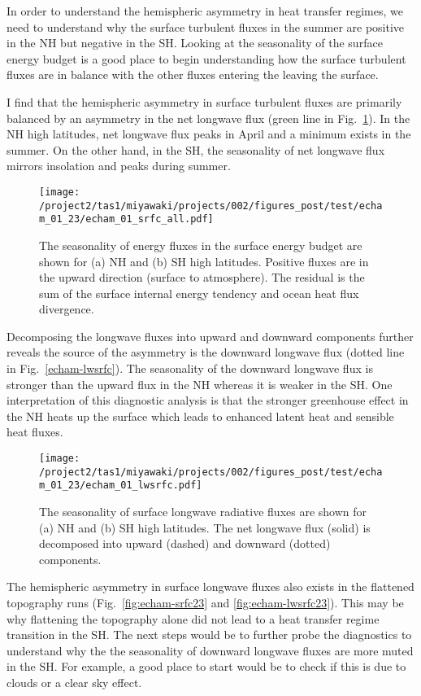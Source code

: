 \documentclass{article}
\begin{document}
In order to understand the hemispheric asymmetry in heat transfer regimes, we need to understand why the surface turbulent fluxes in the summer are positive in the NH but negative in the SH. Looking at the seasonality of the surface energy budget is a good place to begin understanding how the surface turbulent fluxes are in balance with the other fluxes entering the leaving the surface.

I find that the hemispheric asymmetry in surface turbulent fluxes are primarily balanced by an asymmetry in the net longwave flux (green line in Fig.~\ref{fig:echam-srfc}). In the NH high latitudes, net longwave flux peaks in April and a minimum exists in the summer. On the other hand, in the SH, the seasonality of net longwave flux mirrors insolation and peaks during summer.

\begin{figure}
    \texttt{[image: /project2/tas1/miyawaki/projects/002/figures\_post/test/echam\_01\_23/echam\_01\_srfc\_all.pdf]}
    \caption{The seasonality of energy fluxes in the surface energy budget are shown for (a) NH and (b) SH high latitudes. Positive fluxes are in the upward direction (surface to atmosphere). The residual is the sum of the surface internal energy tendency and ocean heat flux divergence.}
    \label{fig:echam-srfc}
\end{figure}

Decomposing the longwave fluxes into upward and downward components further reveals the source of the asymmetry is the downward longwave flux (dotted line in Fig.~\ref{echam-lwsrfc}). The seasonality of the downward longwave flux is stronger than the upward flux in the NH whereas it is weaker in the SH. One interpretation of this diagnostic analysis is that the stronger greenhouse effect in the NH heats up the surface which leads to enhanced latent heat and sensible heat fluxes. 

\begin{figure}
    \texttt{[image: /project2/tas1/miyawaki/projects/002/figures\_post/test/echam\_01\_23/echam\_01\_lwsrfc.pdf]}
    \caption{The seasonality of surface longwave radiative fluxes are shown for (a) NH and (b) SH high latitudes. The net longwave flux (solid) is decomposed into upward (dashed) and downward (dotted) components.}
    \label{fig:echam-lwsrfc}
\end{figure}

The hemispheric asymmetry in surface longwave fluxes also exists in the flattened topography runs (Fig.~\ref{fig:echam-srfc23} and \ref{fig:echam-lwsrfc23}). This may be why flattening the topography alone did not lead to a heat transfer regime transition in the SH. The next steps would be to further probe the diagnostics to understand why the the seasonality of downward longwave fluxes are more muted in the SH. For example, a good place to start would be to check if this is due to clouds or a clear sky effect.
\end{document}
